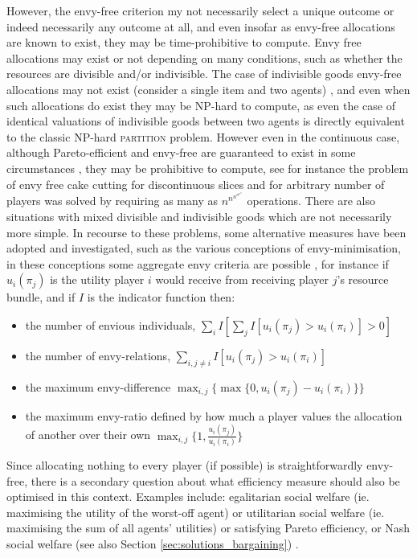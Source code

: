 However, the envy-free criterion my not necessarily select a unique outcome or indeed necessarily any outcome at all, and even insofar as envy-free allocations are known to exist, they may be time-prohibitive to compute.
Envy free allocations may exist or not depending on many conditions, such as whether the resources are divisible and/or indivisible. The case of indivisible goods envy-free allocations may not exist (consider a single item and two agents) \citep{DBLP:conf/aaai/ManurangsiS19}, and even when such allocations do exist they may be NP-hard to compute, as even the case of identical valuations of indivisible goods between two agents is directly equivalent to the classic NP-hard \textsc{partition} problem. \citep{NGUYEN201454}
However even in the continuous case, although Pareto-efficient and envy-free are guaranteed to exist in some circumstances \citep{WELLER19855,COLE2021105207}, they may be prohibitive to compute, see for instance the problem of envy free cake cutting for discontinuous slices and for arbitrary number of players was solved by \cite{DBLP:conf/focs/AzizM16} requiring as many as $n^{n^{n^{n^{n^n}}}}$ operations.
There are also situations with mixed divisible and indivisible goods which are not necessarily more simple.\citep{BEI2021103436}
In recourse to these problems, some alternative measures have been adopted and investigated, such as the various conceptions of envy-minimisation,
in these conceptions some aggregate envy criteria are possible \citep{10.1145/3219166.3219179,10.1145/988772.988792,NGUYEN201454}, for instance if $u_i(\pi_j)$ is the utility player $i$ would receive from receiving player $j$'s resource bundle, and if $I$ is the indicator function then: 
\begin{itemize}
\item the number of envious individuals, $\sum_iI[\sum_jI[u_i(\pi_j)>u_i(\pi_i)]>0]$
\item the number of envy-relations, $\sum_{i,j\ne i}I[u_i(\pi_j)>u_i(\pi_i)]$
\item the maximum envy-difference $\max_{i,j}\{\max\{0,u_i(\pi_j)-u_i(\pi_i)\}\}$ 
\item the maximum envy-ratio defined by how much a player values the allocation of another over their own $\max_{i,j}\{1,\frac{u_i(\pi_j)}{u_i(\pi_i)}\}$
\end{itemize}
Since allocating nothing to every player (if possible) is straightforwardly envy-free, there is a secondary question about what efficiency measure should also be optimised in this context.
Examples include: egalitarian social welfare (ie. maximising the utility of the worst-off agent) or utilitarian social welfare (ie. maximising the sum of all agents' utilities) or satisfying Pareto efficiency, or Nash social welfare (see also Section \ref{sec:solutions_bargaining}) \citep{NGUYEN201454}.

